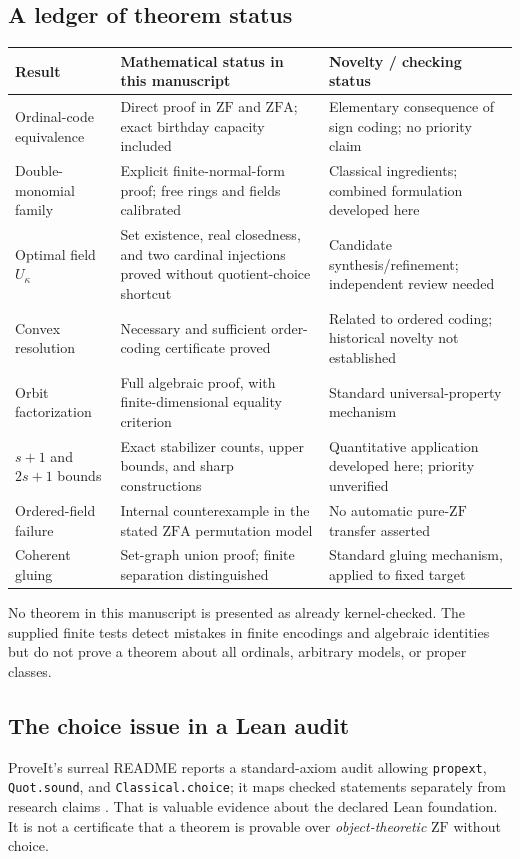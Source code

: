 \documentclass[11pt,letterpaper]{article}
\theoremstyle{definition}
\theoremstyle{remark}
\newcommand{\ZF}{\mathrm{ZF}}
\newcommand{\ZFA}{\mathrm{ZFA}}
\begin{document}
\subsection{A ledger of theorem status}
\begin{longtable}{@{}P{0.24\textwidth}P{0.40\textwidth}P{0.29\textwidth}@{}}
\toprule
Result & Mathematical status in this manuscript & Novelty / checking status \\
\midrule
\endhead
Ordinal-code equivalence & Direct proof in $\ZF$ and $\ZFA$; exact birthday capacity included & Elementary consequence of sign coding; no priority claim \\
\addlinespace
Double-monomial family & Explicit finite-normal-form proof; free rings and fields calibrated & Classical ingredients; combined formulation developed here \\
\addlinespace
Optimal field $U_\kappa$ & Set existence, real closedness, and two cardinal injections proved without quotient-choice shortcut & Candidate synthesis/refinement; independent review needed \\
\addlinespace
Convex resolution & Necessary and sufficient order-coding certificate proved & Related to ordered coding; historical novelty not established \\
\addlinespace
Orbit factorization & Full algebraic proof, with finite-dimensional equality criterion & Standard universal-property mechanism \\
\addlinespace
$s+1$ and $2s+1$ bounds & Exact stabilizer counts, upper bounds, and sharp constructions & Quantitative application developed here; priority unverified \\
\addlinespace
Ordered-field failure & Internal counterexample in the stated $\ZFA$ permutation model & No automatic pure-$\ZF$ transfer asserted \\
\addlinespace
Coherent gluing & Set-graph union proof; finite separation distinguished & Standard gluing mechanism, applied to fixed target \\
\bottomrule
\end{longtable}

No theorem in this manuscript is presented as already kernel-checked. The supplied finite tests detect mistakes in finite encodings and algebraic identities but do not prove a theorem about all ordinals, arbitrary models, or proper classes.

\subsection{The choice issue in a Lean audit}
ProveIt's surreal README reports a standard-axiom audit allowing \texttt{propext}, \texttt{Quot.sound}, and \texttt{Classical.choice}; it maps checked statements separately from research claims \cite{ProveItSurreal}. That is valuable evidence about the declared Lean foundation. It is not a certificate that a theorem is provable over \emph{object-theoretic} $\ZF$ without choice.
\end{document}
